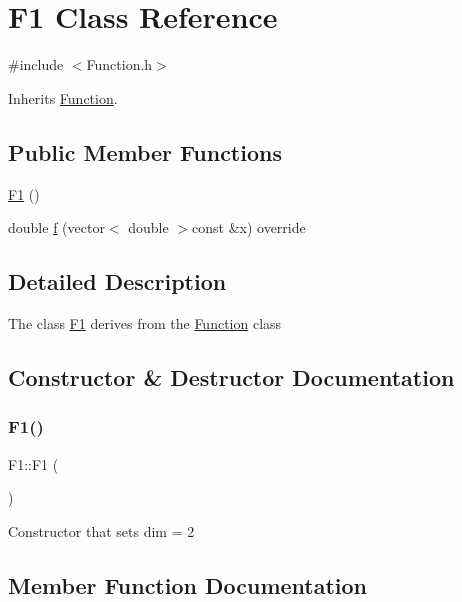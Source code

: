 \hypertarget{class_f1}{}\section{F1 Class Reference}
\label{class_f1}


{\ttfamily \#include $<$Function.\+h$>$}



Inherits \hyperlink{class_function}{Function}.

\subsection*{Public Member Functions}
\begin{DoxyCompactItemize}
\item 
\hyperlink{class_f1_a6b49c2459c63dfbbf08c39e8feff25e2}{F1} ()
\item 
double \hyperlink{class_f1_ae5fee27c70b7ea338cfb791bd830297b}{f} (vector$<$ double $>$const \&x) override
\end{DoxyCompactItemize}


\subsection{Detailed Description}
The class \hyperlink{class_f1}{F1} derives from the \hyperlink{class_function}{Function} class 

\subsection{Constructor \& Destructor Documentation}
\mbox{\label{class_f1_a6b49c2459c63dfbbf08c39e8feff25e2}} 
\subsubsection{\texorpdfstring{F1()}{F1()}}
{\footnotesize\ttfamily F1\+::\+F1 (\begin{DoxyParamCaption}{ }\end{DoxyParamCaption})\hspace{0.3cm}{\ttfamily [inline]}}

Constructor that sets dim = 2 

\subsection{Member Function Documentation}
\mbox{\label{class_f1_ae5fee27c70b7ea338cfb791bd830297b}} 
